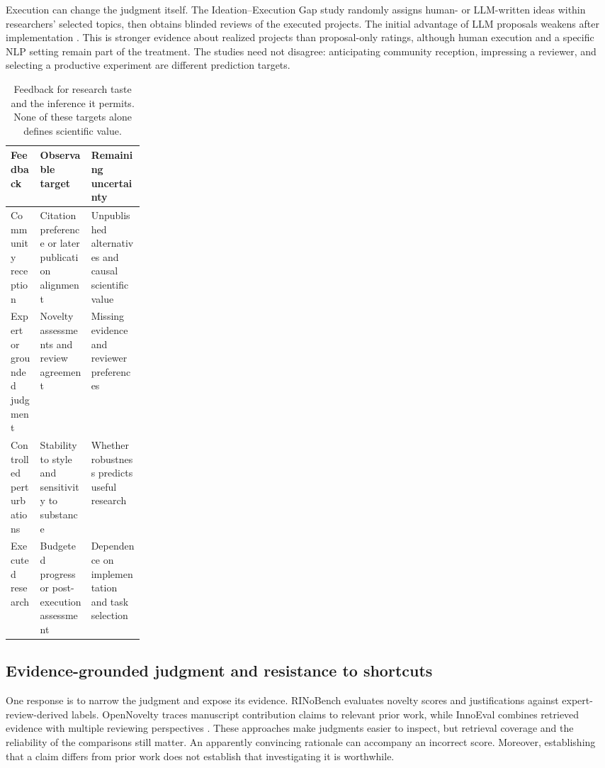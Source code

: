 Execution can change the judgment itself. The Ideation--Execution Gap study randomly assigns human- or LLM-written ideas within researchers' selected topics, then obtains blinded reviews of the executed projects. The initial advantage of LLM proposals weakens after implementation \cite{ideation-execution-gap}. This is stronger evidence about realized projects than proposal-only ratings, although human execution and a specific NLP setting remain part of the treatment. The studies need not disagree: anticipating community reception, impressing a reviewer, and selecting a productive experiment are different prediction targets.

\begin{table}[t]
\centering
\small
\caption{Feedback for research taste and the inference it permits. None of these targets alone defines scientific value.}
\label{tab:taste-feedback}
\begin{tabularx}{\linewidth}{@{}P{0.22\linewidth}YY@{}}
\toprule
Feedback & Observable target & Remaining uncertainty \\
\midrule
Community reception \cite{ai-can-learn-scientific-taste,hindsight} & Citation preference or later publication alignment & Unpublished alternatives and causal scientific value \\
Expert or grounded judgment \cite{rinobench,opennovelty,innoeval} & Novelty assessments and review agreement & Missing evidence and reviewer preferences \\
Controlled perturbations \cite{scistylebench} & Stability to style and sensitivity to substance & Whether robustness predicts useful research \\
Executed research \cite{tasteval,ideation-execution-gap} & Budgeted progress or post-execution assessment & Dependence on implementation and task selection \\
\bottomrule
\end{tabularx}
\end{table}

\subsection{Evidence-grounded judgment and resistance to shortcuts}

One response is to narrow the judgment and expose its evidence. RINoBench evaluates novelty scores and justifications against expert-review-derived labels. OpenNovelty traces manuscript contribution claims to relevant prior work, while InnoEval combines retrieved evidence with multiple reviewing perspectives \cite{rinobench,opennovelty,innoeval}. These approaches make judgments easier to inspect, but retrieval coverage and the reliability of the comparisons still matter. An apparently convincing rationale can accompany an incorrect score. Moreover, establishing that a claim differs from prior work does not establish that investigating it is worthwhile.

